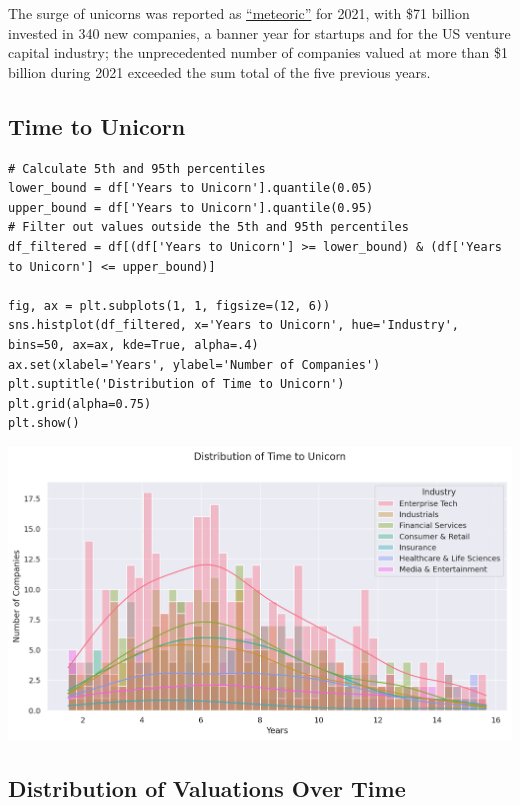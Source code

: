 \documentclass[a4paper,12pt]{article}
\begin{document}
The surge of unicorns was reported as \href{https://pitchbook.com/news/articles/us-unicorns-2021-venture-capital-valuations}{``meteoric''} for 2021, with \$71 billion invested in 340 new companies, a banner year for startups and for the US venture capital industry; the unprecedented number of companies valued at more than \$1 billion during 2021 exceeded the sum total of the five previous years.
\subsection{Time to Unicorn}
\label{sec:org14cc44b}

\begin{verbatim}
# Calculate 5th and 95th percentiles
lower_bound = df['Years to Unicorn'].quantile(0.05)
upper_bound = df['Years to Unicorn'].quantile(0.95)
# Filter out values outside the 5th and 95th percentiles
df_filtered = df[(df['Years to Unicorn'] >= lower_bound) & (df['Years to Unicorn'] <= upper_bound)]

fig, ax = plt.subplots(1, 1, figsize=(12, 6))
sns.histplot(df_filtered, x='Years to Unicorn', hue='Industry', bins=50, ax=ax, kde=True, alpha=.4)
ax.set(xlabel='Years', ylabel='Number of Companies')
plt.suptitle('Distribution of Time to Unicorn')
plt.grid(alpha=0.75)
plt.show()
\end{verbatim}

\begin{center}
\includegraphics[width=.9\linewidth]{./.ob-jupyter/3c56a433ece1ec2cf4e83e3ba320a0aee5c2ee70.png}
\label{}
\end{center}
\subsection{Distribution of Valuations Over Time}
\label{sec:orge808ad3}
\end{document}
